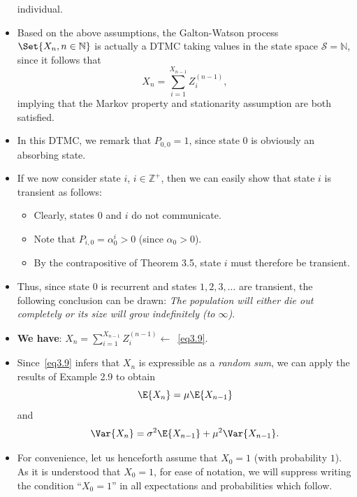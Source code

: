 \begin{itemize}
          individual.
    \item Based on the above assumptions, the Galton-Watson process $ \Set{X_n,n\in\mathbb{N}} $ is actually a DTMC
          taking values in the state space $ \mathcal{S}=\mathbb{N} $, since it follows that
          \[ X_n=\sum_{i=1}^{X_{n-1}} Z_i^{(n-1)},\label{eq3.9}\tag*{(3.9)} \]
          implying that the Markov property and stationarity assumption are both satisfied.
    \item In this DTMC, we remark that $ P_{0,0}=1 $, since state $0$ is obviously an absorbing state.
    \item If we now consider state $ i $, $ i\in\mathbb{Z}^+ $, then we can easily show that state $ i $ is transient as follows:
          \begin{itemize}
              \item Clearly, states $ 0 $ and $ i $ do not communicate.
              \item Note that $ P_{i,0}=\alpha_0^i>0 $ (since $ \alpha_0>0 $).
              \item By the contrapositive of Theorem 3.5, state $i$ must therefore be transient.
          \end{itemize}
    \item Thus, since state $0$ is recurrent and states $ 1,2,3,\ldots $ are transient, the following conclusion can
          be drawn: \emph{The population will either die out completely or its size will grow indefinitely (to $ \infty $)}.
    \item \textbf{We have}: $ X_n=\sum_{i=1}^{X_{n-1}} Z_i^{(n-1)} \leftarrow $~\ref{eq3.9}.
    \item Since~\ref{eq3.9} infers that $X_n$ is expressible as a \emph{random sum}, we can apply the results of Example
          2.9 to obtain
          \[ \E{X_n}=\mu\E{X_{n-1}} \]
          and
          \[ \Var{X_n}=\sigma^2\E{X_{n-1}}+\mu^2\Var{X_{n-1}}. \]
    \item For convenience, let us henceforth assume that $X_0 = 1$ (with probability $1$). As it is
          understood that $X_0 = 1$, for ease of notation, we will suppress writing the condition ``$X_0 = 1$''
          in all expectations and probabilities which follow.
\end{itemize}

